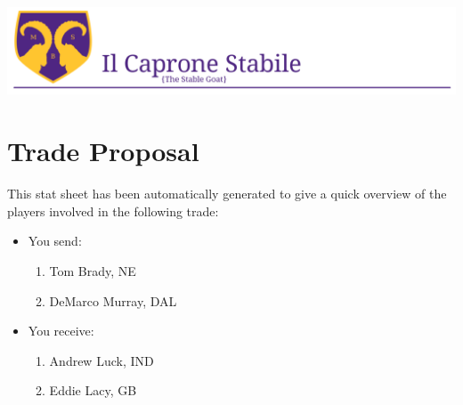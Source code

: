 \documentclass{article}
\begin{document}
\begin{center}
    \includegraphics[scale=.30]{Header.png} \\
\end{center}

\section*{Trade Proposal}

    This stat sheet has been automatically generated to give a quick overview of the players involved in the following trade:

    \begin{itemize}

        \item You send:
        \begin{enumerate}
\item Tom Brady, NE
\item DeMarco Murray, DAL
        \end{enumerate}

        \item You receive:
        \begin{enumerate}
\item Andrew Luck, IND
\item Eddie Lacy, GB
        \end{enumerate}

    \end{itemize}
\end{document}
